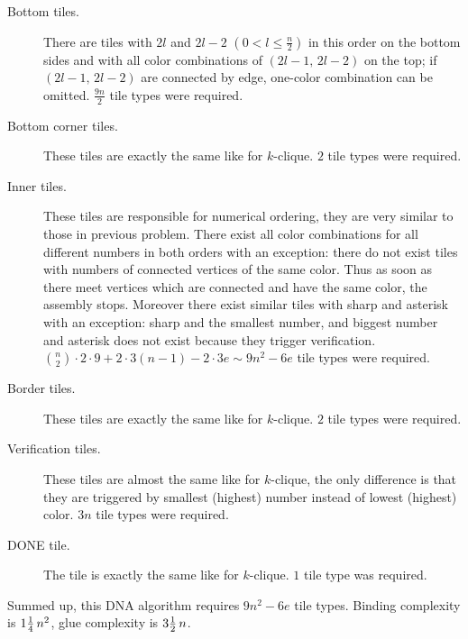 \begin{description}
	\item[Bottom tiles.] There are tiles with $2l$ and $2l-2$ $(0 < l \leq \frac{n}{2})$ in this order on the bottom sides and with all color combinations of $(2l-1,\,2l-2)$ on the top; if $(2l-1,\,2l-2)$ are connected by edge, one-color combination can be omitted. $\frac{9n}{2}$ tile types were required.
	\item[Bottom corner tiles.] These tiles are exactly the same like for $k$-clique. $2$ tile types were required.
	\item[Inner tiles.] These tiles are responsible for numerical ordering, they are very similar to those in previous problem. There exist all color combinations for all different numbers in both orders with an exception: there do not exist tiles with numbers of connected vertices of the same color. Thus as soon as there meet vertices which are connected and have the same color, the assembly stops. Moreover there exist similar tiles with sharp and asterisk with an exception: sharp and the smallest number, and biggest number and asterisk does not exist because they trigger verification. $\binom{n}{2} \cdot 2 \cdot 9 + 2 \cdot 3 (n-1) - 2 \cdot 3 e \sim 9n^2 - 6e$ tile types were required.
	\item[Border tiles.] These tiles are exactly the same like for $k$-clique. $2$ tile types were required.
	\item[Verification tiles.] These tiles are almost the same like for $k$-clique, the only difference is that they are triggered by smallest (highest) number instead of lowest (highest) color. $3n$ tile types were required.
	\item[DONE tile.] The tile is exactly the same like for $k$-clique. $1$ tile type was required.
\end{description}

Summed up, this DNA algorithm requires $9n^2 - 6e$ tile types. Binding complexity is $1\nicefrac{1}{4}\,n^2$, glue complexity is $3\nicefrac{1}{2}\,n$.

